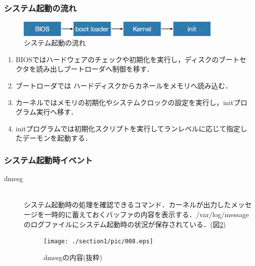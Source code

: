 \subsubsection{システム起動の流れ}
\begin{figure}[!h]
	\begin{center}
		\includegraphics[width=10cm]{./section1/pic/007.eps}
		\caption{システム起動の流れ}
		\label{007}
	\end{center}
\end{figure}
\begin{enumerate}
	\item BIOSではハードウェアのチェックや初期化を実行し，ディスクのブートセクタを読み出しブートローダへ制御を移す．
	\item ブートローダでは	ハードディスクからカネールをメモリへ読み込む．
	\item カーネルではメモリの初期化やシステムクロックの設定を実行し，initプログラム実行へ移す．
	\item initプログラムでは初期化スクリプトを実行してランレベルに応じて指定したデーモンを起動する．
\end{enumerate}

\subsubsection{システム起動時イベント}
\begin{description}
	\item[dmesg]\mbox{}\\
	システム起動時の処理を確認できるコマンド．カーネルが出力したメッセージを一時的に蓄えておくバッファの内容を表示する．/var/log/messageのログファイルにシステム起動時の状況が保存されている．(図\ref{008})
		\begin{figure}[!h]
			\begin{center}
				\texttt{[image: ./section1/pic/008.eps]}
				\caption{dmesgの内容(抜粋)}
				\label{008}
			\end{center}
		\end{figure}
\end{description}

